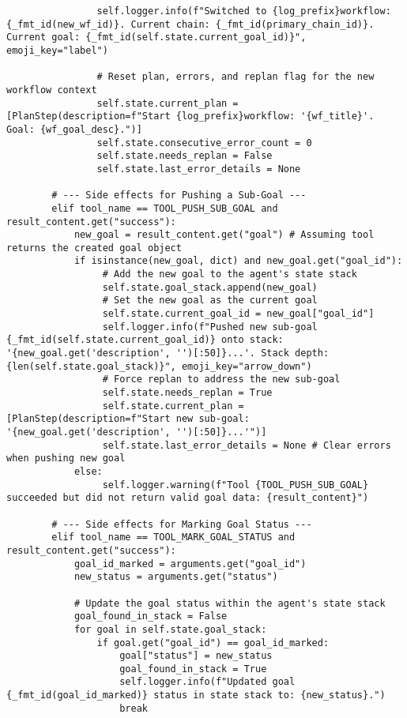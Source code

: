 \documentclass[12pt,a4paper]{article}
\begin{document}
\begin{pageablecode}
\begin{verbatim}
                self.logger.info(f"Switched to {log_prefix}workflow: {_fmt_id(new_wf_id)}. Current chain: {_fmt_id(primary_chain_id)}. Current goal: {_fmt_id(self.state.current_goal_id)}", emoji_key="label")

                # Reset plan, errors, and replan flag for the new workflow context
                self.state.current_plan = [PlanStep(description=f"Start {log_prefix}workflow: '{wf_title}'. Goal: {wf_goal_desc}.")]
                self.state.consecutive_error_count = 0
                self.state.needs_replan = False
                self.state.last_error_details = None

        # --- Side effects for Pushing a Sub-Goal ---
        elif tool_name == TOOL_PUSH_SUB_GOAL and result_content.get("success"):
            new_goal = result_content.get("goal") # Assuming tool returns the created goal object
            if isinstance(new_goal, dict) and new_goal.get("goal_id"):
                 # Add the new goal to the agent's state stack
                 self.state.goal_stack.append(new_goal)
                 # Set the new goal as the current goal
                 self.state.current_goal_id = new_goal["goal_id"]
                 self.logger.info(f"Pushed new sub-goal {_fmt_id(self.state.current_goal_id)} onto stack: '{new_goal.get('description', '')[:50]}...'. Stack depth: {len(self.state.goal_stack)}", emoji_key="arrow_down")
                 # Force replan to address the new sub-goal
                 self.state.needs_replan = True
                 self.state.current_plan = [PlanStep(description=f"Start new sub-goal: '{new_goal.get('description', '')[:50]}...'")]
                 self.state.last_error_details = None # Clear errors when pushing new goal
            else:
                 self.logger.warning(f"Tool {TOOL_PUSH_SUB_GOAL} succeeded but did not return valid goal data: {result_content}")

        # --- Side effects for Marking Goal Status ---
        elif tool_name == TOOL_MARK_GOAL_STATUS and result_content.get("success"):
            goal_id_marked = arguments.get("goal_id")
            new_status = arguments.get("status")

            # Update the goal status within the agent's state stack
            goal_found_in_stack = False
            for goal in self.state.goal_stack:
                if goal.get("goal_id") == goal_id_marked:
                    goal["status"] = new_status
                    goal_found_in_stack = True
                    self.logger.info(f"Updated goal {_fmt_id(goal_id_marked)} status in state stack to: {new_status}.")
                    break


\end{verbatim}
\end{pageablecode}
\end{document}
